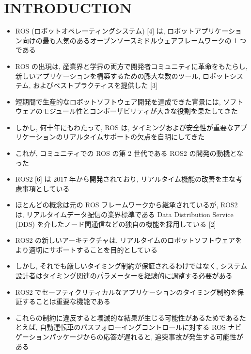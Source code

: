 
\section{INTRODUCTION}
\label{sec: introduction}

\begin{frame}{}
    \begin{itemize}
        \item ROS (ロボットオペレーティングシステム) [4] は, ロボットアプリケーション向けの最も人気のあるオープンソースミドルウェアフレームワークの 1 つである
\item ROS の出現は, 産業界と学界の両方で開発者コミュニティに革命をもたらし, 新しいアプリケーションを構築するための膨大な数のツール, ロボットシステム, およびベストプラクティスを提供した [3]
\item 短期間で生産的なロボットソフトウェア開発を達成できた背景には, ソフトウェアのモジュール性とコンポーザビリティが大きな役割を果たしてきた
\item しかし, 何十年にもわたって, ROS は, タイミングおよび安全性が重要なアプリケーションのリアルタイムサポートの欠点を自明にしてきた
\item これが, コミュニティでの ROS の第 2 世代である ROS2 の開発の動機となった
    \end{itemize}
\end{frame}

\begin{frame}{}
    \begin{itemize}
        \item ROS2 [6] は 2017 年から開発されており, リアルタイム機能の改善を主な考慮事項としている
\item ほとんどの概念は元の ROS フレームワークから継承されているが, ROS2 は, リアルタイムデータ配信の業界標準である Data Distribution Service (DDS) を介したノード間通信などの独自の機能を採用している [2]
\item ROS2 の新しいアーキテクチャは, リアルタイムのロボットソフトウェアをより適切にサポートすることを目的としている
\item しかし, それでも厳しいタイミング制約が保証されるわけではなく, システム設計者はタイミング関連のパラメーターを経験的に調整する必要がある
    \end{itemize}
\end{frame}

\begin{frame}{}
    \begin{itemize}
        \item ROS2 でセーフティクリティカルなアプリケーションのタイミング制約を保証することは重要な機能である
\item これらの制約に違反すると壊滅的な結果が生じる可能性があるためであるたとえば, 自動運転車のパスフォローイングコントロールに対する ROS ナビゲーションパッケージからの応答が遅れると, 追突事故が発生する可能性がある
    \end{itemize}
\end{frame}

